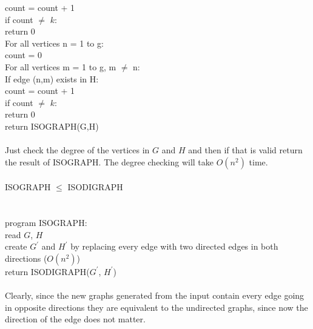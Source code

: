 \documentclass[10pt]{article}
\newcommand{\tab}{\hspace*{2em}}
\newcommand{\tabb}{\hspace*{4em}}
\newcommand{\tabbb}{\hspace*{6em}}
\newcommand{\tabbbb}{\hspace*{8em}}
\begin{document}
		\tabbbb count = count + 1\\
		\tabb if count $\neq$ $k$:\\
		\tabbb return 0\\
		\tab For all vertices n = 1 to g:\\
		\tabb count = 0\\
		\tabb For all vertices m = 1 to g, m $\neq$ n:\\
		\tabbb If edge (n,m) exists in H:\\
		\tabbbb count = count + 1\\
		\tabb if count $\neq$ $k$:\\
		\tabbb return 0\\
		\tab return ISOGRAPH(G,H)\\
		\\
		Just check the degree of the vertices in $G$ and $H$ and then if that is valid return the result of ISOGRAPH. The degree checking will
		take $O(n^2)$ time.\\
		\\
		ISOGRAPH $\leq$ ISODIGRAPH\\
		\\
		\\
		program ISOGRAPH:\\
		\tab read $G$, $H$\\
		\tab create $G^\prime$ and $H^\prime$ by replacing every edge with two directed edges in both directions ($O(n^2)$)\\
		\tab return ISODIGRAPH($G^\prime$, $H^\prime$)\\
		\\
		Clearly, since the new graphs generated from the input contain every edge going in opposite directions they are equivalent
		to the undirected graphs, since now the direction of the edge does not matter.\\
		\\
		
\end{document}
